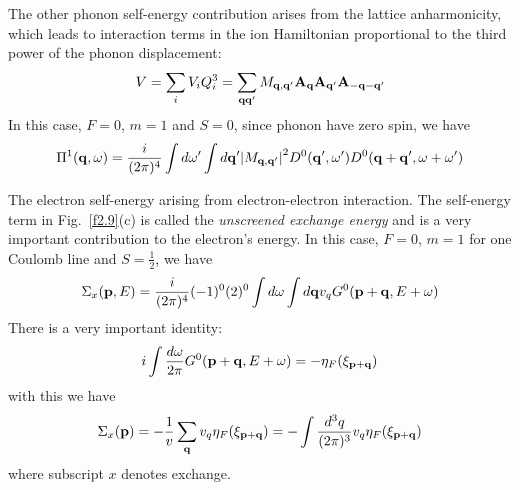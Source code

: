 The other phonon self-energy contribution arises from the lattice anharmonicity, which leads to interaction terms in the ion Hamiltonian proportional to the third power of the phonon displacement:
\begin{equation*}
  V = \sum_i V_i Q_i^3 =\sum_{\mathbf{q}\mathbf{q}'}M_{\mathbf{q},\mathbf{q}'} \mathbf{A}_{\mathbf{q}} \mathbf{A}_{\mathbf{q}'} \mathbf{A}_{-\mathbf{q}-\mathbf{q}'}
\end{equation*}
In this case, $F=0$, $m=1$ and $S=0$, since phonon have zero spin, we have
\begin{equation}
  \label{2.133}
  \Pi^1(\mathbf{q},\omega) = \frac{i}{(2\pi)^4} \int d\omega' \int d\mathbf{q}' \abs{M_{\mathbf{q},\mathbf{q}'}}^2 D^0(\mathbf{q}',\omega') D^0(\mathbf{q}+\mathbf{q}',\omega+\omega')
\end{equation}

The electron self-energy arising from electron-electron interaction.
The self-energy term in Fig.~\ref{f2.9}(c) is called the \textit{unscreened exchange energy} and is a very important contribution to the electron's energy.
In this case, $F=0$, $m=1$ for one Coulomb line and $S=\frac{1}{2}$, we have
\begin{equation}
  \label{2.134}
  \Sigma_x(\mathbf{p},E) = \frac{i}{(2\pi)^4}(-1)^0(2)^0 \int d\omega \int d\mathbf{q} v_q G^0(\mathbf{p}+\mathbf{q},E+\omega)
\end{equation}
There is a very important identity:
\begin{equation}
  \label{2.135}
  i\int \frac{d\omega}{2\pi} G^0(\mathbf{p}+\mathbf{q},E+\omega) = -\eta_F(\xi_{\mathbf{p}+\mathbf{q}})
\end{equation}
with this we have
\begin{equation}
  \label{2.138}
  \Sigma_x(\mathbf{p}) = -\frac{1}{v} \sum_{\mathbf{q}} v_q \eta_F(\xi_{\mathbf{p}+\mathbf{q}}) = -\int\frac{d^3q}{(2\pi)^3} v_q \eta_F(\xi_{\mathbf{p}+\mathbf{q}})
\end{equation}
where subscript $x$ denotes exchange.

